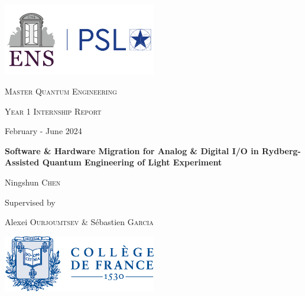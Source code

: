\begin{titlepage}
    \centering
    
    \includegraphics[width=0.5\textwidth]{images/chapter_0/ens-psl.png} \par\vspace{1cm}
    
    {\LARGE \textsc{Master Quantum Engineering} \par}
    \vspace{0.25cm}
    
    {\Large \textsc{Year 1 Internship Report} \par}
    \vspace{0.25cm}
    
    {February - June 2024}
    \vspace{1.5cm}
    
    {\huge\bfseries Software \& Hardware Migration for Analog \& Digital I/O in Rydberg-Assisted Quantum Engineering of Light Experiment \par}
    \vspace{1.5cm}
    
    {\Large Ningshun \textsc{Chen} \par}
    \vspace{0.25cm}
    
    Supervised by \par
    Alexei \textsc{Ourjoumtsev} \& Sébastien \textsc{Garcia} 
    \vfill
    
    
    \includegraphics[width=0.5\textwidth]{images/chapter_0/cdf.png}
\end{titlepage}
